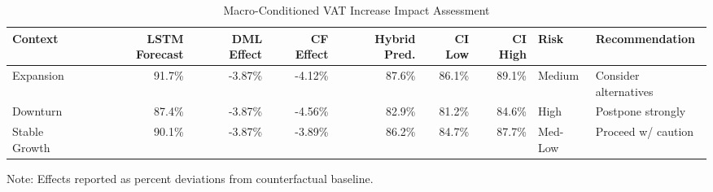 \begin{table}[htbp]
  \centering
  \caption{Macro-Conditioned VAT Increase Impact Assessment}
  \label{tab:vat_increase_scenario}
  \small
  \begin{tabular}{lrrrrrrll}
    \toprule
    Context & LSTM Forecast & DML Effect & CF Effect & Hybrid Pred. & CI Low & CI High & Risk & Recommendation \\
    \midrule
    Expansion & 91.7\% & -3.87\% & -4.12\% & 87.6\% & 86.1\% & 89.1\% & Medium & Consider alternatives \\
    Downturn & 87.4\% & -3.87\% & -4.56\% & 82.9\% & 81.2\% & 84.6\% & High & Postpone strongly \\
    Stable Growth & 90.1\% & -3.87\% & -3.89\% & 86.2\% & 84.7\% & 87.7\% & Med-Low & Proceed w/ caution \\
    \bottomrule
  \end{tabular}
  \vspace{0.5em}
  {\footnotesize Note: Effects reported as percent deviations from counterfactual baseline.}
\end{table}
